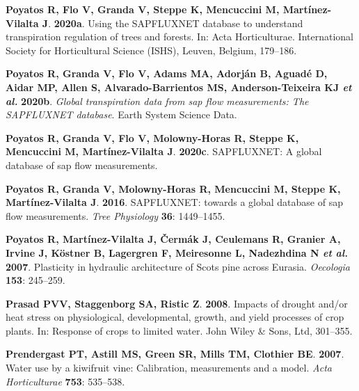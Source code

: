 \documentclass[11pt,twoside]{reedthesis}
\begin{document}
\hypertarget{ref-poyatos2020b}{}
\textbf{\textnormal{Poyatos R}, \textnormal{Flo V}, \textnormal{Granda
V}, \textnormal{Steppe K}, \textnormal{Mencuccini M},
\textnormal{Martínez-Vilalta J}}. \textbf{2020a}. Using the SAPFLUXNET
database to understand transpiration regulation of trees and forests.
In: Acta Horticulturae. International Society for Horticultural Science
(ISHS), Leuven, Belgium, 179--186.

\hypertarget{ref-poyatos_global_2020}{}
\textbf{\textnormal{Poyatos R}, \textnormal{Granda V}, \textnormal{Flo
V}, \textnormal{Adams MA}, \textnormal{Adorján B}, \textnormal{Aguadé
D}, \textnormal{Aidar MP}, \textnormal{Allen S},
\textnormal{Alvarado-Barrientos MS}, \textnormal{Anderson-Teixeira KJ}
\emph{et al.}} \textbf{2020b}. \emph{Global transpiration data from sap
flow measurements: The SAPFLUXNET database}. Earth System Science Data.

\hypertarget{ref-rafael_poyatos_2020}{}
\textbf{\textnormal{Poyatos R}, \textnormal{Granda V}, \textnormal{Flo
V}, \textnormal{Molowny-Horas R}, \textnormal{Steppe K},
\textnormal{Mencuccini M}, \textnormal{Martínez-Vilalta J}}.
\textbf{2020c}. SAPFLUXNET: A global database of sap flow measurements.

\hypertarget{ref-Poyatos2016}{}
\textbf{\textnormal{Poyatos R}, \textnormal{Granda V},
\textnormal{Molowny-Horas R}, \textnormal{Mencuccini M},
\textnormal{Steppe K}, \textnormal{Martínez-Vilalta J}}. \textbf{2016}.
SAPFLUXNET: towards a global database of sap flow measurements.
\emph{Tree Physiology} \textbf{36}: 1449--1455.

\hypertarget{ref-Poyatos2007}{}
\textbf{\textnormal{Poyatos R}, \textnormal{Martínez-Vilalta J},
\textnormal{Čermák J}, \textnormal{Ceulemans R}, \textnormal{Granier A},
\textnormal{Irvine J}, \textnormal{Köstner B}, \textnormal{Lagergren F},
\textnormal{Meiresonne L}, \textnormal{Nadezhdina N} \emph{et al.}}
\textbf{2007}. Plasticity in hydraulic architecture of Scots pine across
Eurasia. \emph{Oecologia} \textbf{153}: 245--259.

\hypertarget{ref-Prasad2008}{}
\textbf{\textnormal{Prasad PVV}, \textnormal{Staggenborg SA},
\textnormal{Ristic Z}}. \textbf{2008}. Impacts of drought and/or heat
stress on physiological, developmental, growth, and yield processes of
crop plants. In: Response of crops to limited water. John Wiley \& Sons,
Ltd, 301--355.

\hypertarget{ref-Prendergast2007}{}
\textbf{\textnormal{Prendergast PT}, \textnormal{Astill MS},
\textnormal{Green SR}, \textnormal{Mills TM}, \textnormal{Clothier BE}}.
\textbf{2007}. Water use by a kiwifruit vine: Calibration, measurements
and a model. \emph{Acta Horticulturae} \textbf{753}: 535--538.
\end{document}
